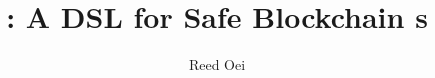 \documentclass[nonacm, dvipsnames, sigconf]{acmart}
\begin{document}
\title{\langName: A DSL for Safe Blockchain \AssetTxt{}s}

\author{Reed Oei}


\begin{abstract}
\end{abstract}

\end{document}
